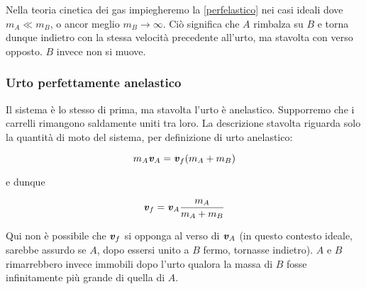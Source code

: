 Nella teoria cinetica dei gas impiegheremo la \ref{perfelastico} nei
casi ideali dove $m_A \ll m_B$, o ancor meglio $m_B \to \infty$. Ciò significa
che $A$ rimbalza su $B$ e torna dunque indietro con la stessa velocità
precedente all'urto, ma stavolta con verso opposto. $B$ invece non si
muove.


\subsubsection*{Urto perfettamente anelastico}
Il sistema è lo stesso di prima, ma stavolta l'urto è anelastico.
Supporremo che i carrelli rimangono saldamente uniti tra loro. La
descrizione stavolta riguarda solo la quantità di moto del sistema,
per definizione di urto anelastico:

\[
m_A\textbf{\textit{v}}_A = \textbf{\textit{v}}_f(m_A + m_B)
\]

\noindent e dunque

\[
\textbf{\textit{v}}_f = \textbf{\textit{v}}_A \frac{m_A}{m_A + m_B}
\]

\noindent Qui non è possibile che $\textbf{\textit{v}}_f$ si opponga al
verso di $\textbf{\textit{v}}_A$ (in questo contesto ideale, sarebbe assurdo
se $A$, dopo essersi unito a $B$ fermo, tornasse indietro). $A$
e $B$ rimarrebbero invece immobili dopo l'urto qualora la massa di
$B$ fosse infinitamente più grande di quella di $A$.